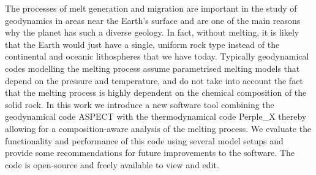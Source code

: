 The processes of melt generation and migration are important in the study of geodynamics in areas near the Earth's surface and are one of the main reasons why the planet has such a diverse geology.
In fact, without melting, it is likely that the Earth would just have a single, uniform rock type instead of the continental and oceanic lithospheres that we have today.
Typically geodynamical codes modelling the melting process assume parametrised melting models that depend on the pressure and temperature, and do not take into account the fact that the melting process is highly dependent on the chemical composition of the solid rock.
In this work we introduce a new software tool combining the geodynamical code ASPECT with the thermodynamical code Perple\_X thereby allowing for a composition-aware analysis of the melting process.
We evaluate the functionality and performance of this code using several model setups and provide some recommendations for future improvements to the software.
The code is open-source and freely available to view and edit.